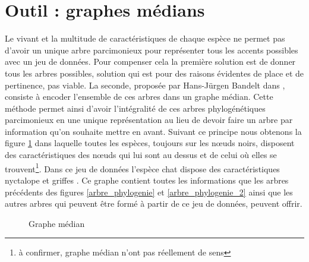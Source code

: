 \section{Outil : graphes médians}

Le vivant et la multitude de caractéristiques de chaque espèce ne permet pas d'avoir un unique arbre parcimonieux pour représenter tous les accents possibles avec un jeu de données. Pour compenser cela la première solution est de donner tous les arbres possibles, solution qui est pour des raisons évidentes de place et de pertinence, pas viable. La seconde, proposée par Hans-Jürgen Bandelt dans \cite{MedianAlgebras}, consiste à encoder l'ensemble de ces arbres dans un graphe médian. Cette méthode permet ainsi d'avoir l'intégralité de ces arbres phylogénétiques parcimonieux en une unique représentation au lieu de devoir faire un arbre par information qu'on souhaite mettre en avant. Suivant ce principe nous obtenons la figure \ref{graphe_median_phylogenie} dans laquelle toutes les espèces, toujours sur les n\oe uds noirs, disposent des caractéristiques des n\oe uds qui lui sont au dessus et de celui où elles se trouvent\footnote{à confirmer, graphe médian n'ont pas réellement de sens}. Dans ce jeu de données l'espèce \guillemotleft{} chat \guillemotright{} dispose des caractéristiques \guillemotleft{} nyctalope \guillemotright{} et \guillemotleft{} griffes \guillemotright{}. Ce graphe contient toutes les informations que les arbres précédents des figures \ref{arbre_phylogenie} et \ref{arbre_phylogenie_2} ainsi que les autres arbres qui peuvent être formé à partir de ce jeu de données, peuvent offrir.

\begin{figure}[H]
	\begin{center}
	\end{center}
	\caption{Graphe médian}
	\label{graphe_median_phylogenie}
\end{figure}

